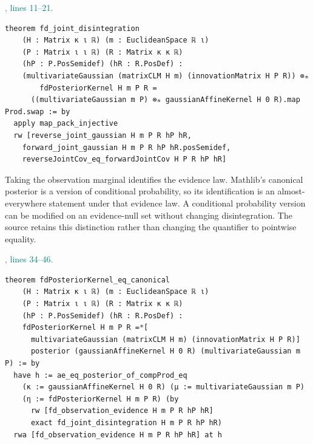 \documentclass[11pt]{article}\usepackage{needspace}\renewcommand{\paperkind}{Lean companion}\setlength{\parskip}{0.35em}
\begin{document}


{\small\textcolor{teal}{, lines 11--21.}\par}

\begin{lstlisting}[style=BayesSource]
theorem fd_joint_disintegration
    (H : Matrix κ ι ℝ) (m : EuclideanSpace ℝ ι)
    (P : Matrix ι ι ℝ) (R : Matrix κ κ ℝ)
    (hP : P.PosSemidef) (hR : R.PosDef) :
    (multivariateGaussian (matrixCLM H m) (innovationMatrix H P R)) ⊗ₘ
        fdPosteriorKernel H m P R =
      ((multivariateGaussian m P) ⊗ₘ gaussianAffineKernel H 0 R).map Prod.swap := by
  apply map_pack_injective
  rw [reverse_joint_gaussian H m P R hP hR,
    forward_joint_gaussian H m P R hP hR.posSemidef,
    reverseJointCov_eq_forwardJointCov H P R hP hR]
\end{lstlisting}

Taking the observation marginal identifies the evidence law. Mathlib's canonical posterior is a version of conditional probability, so its identification is an almost-everywhere statement under that evidence law. A conditional probability version can be modified on an evidence-null set without changing disintegration. The source retains this distinction rather than changing the quantifier to pointwise equality.



{\small\textcolor{teal}{, lines 34--46.}\par}

\begin{lstlisting}[style=BayesSource]
theorem fdPosteriorKernel_eq_canonical
    (H : Matrix κ ι ℝ) (m : EuclideanSpace ℝ ι)
    (P : Matrix ι ι ℝ) (R : Matrix κ κ ℝ)
    (hP : P.PosSemidef) (hR : R.PosDef) :
    fdPosteriorKernel H m P R =ᵐ[
      multivariateGaussian (matrixCLM H m) (innovationMatrix H P R)]
      posterior (gaussianAffineKernel H 0 R) (multivariateGaussian m P) := by
  have h := ae_eq_posterior_of_compProd_eq
    (κ := gaussianAffineKernel H 0 R) (μ := multivariateGaussian m P)
    (η := fdPosteriorKernel H m P R) (by
      rw [fd_observation_evidence H m P R hP hR]
      exact fd_joint_disintegration H m P R hP hR)
  rwa [fd_observation_evidence H m P R hP hR] at h
\end{lstlisting}
\end{document}
